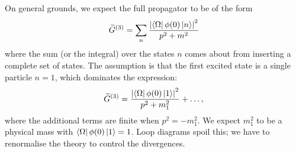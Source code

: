 On general grounds, we expect the full propagator to be of the form
\begin{equation}
  \widetilde{G}^{(3)} = \sum_{n} \frac{\abs{\bra{\Omega} \phi(0) \ket{n}}^2}{p^2 + m^2}
\end{equation}
where the sum (or the integral) over the states $n$ comes about from inserting a complete set of states.
The assumption is that the first excited state is a single particle $n = 1$, which dominates the expression:
 \begin{equation}
   \widetilde{G}^{(3)} = \frac{\abs{\bra{\Omega} \phi(0) \ket{1}}^2}{p^2 + m_1^2} + \dots,
\end{equation}
where the additional terms are finite when $p^2 = -m_1^2$.
We expect $m_1^2$ to be a physical mass with $\bra{\Omega}\phi(0)\ket{1} = 1$.
Loop diagrams spoil this; we have to renormalise the theory to control the divergences.
